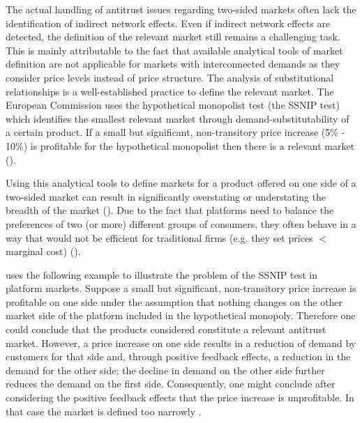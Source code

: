 \documentclass[12pt,a4paper]{scrreprt}
\begin{document}
The actual handling of antitrust issues regarding two-sided markets often lack the identification of indirect network effects. Even if indirect network effects are detected, the definition of the relevant market still remains a challenging task. This is mainly attributable to the fact that available analytical tools of market definition are not applicable for markets with interconnected demands as they consider price levels instead of price structure. The analysis of substitutional relationships is a well-established practice to define the relevant market. The European Commission uses the hypothetical monopolist test (the SSNIP test) which identifies the smallest relevant market through demand-substitutability of a certain product. If a small but significant, non-transitory price increase (5\% - 10\%) is profitable for the hypothetical monopolist then there is a relevant market (\cite{motta_competition_2004}). 

Using this analytical tools to define markets for a product offered on one side of a two-sided market can result in significantly overstating or understating the breadth of the market (\cite{evans_analysis_2008}). Due to the fact that platforms need to balance the preferences of two (or more) different groups of consumers, they often behave in a way that would not be efficient for traditional firms (e.g. they set prices $<$ marginal cost) (\cite{chandra_mergers_2009}).

\cite{evans_market_2012} uses the following example to illustrate the problem of the SSNIP test in platform markets. Suppose a small but significant, non-transitory price increase is profitable on one side under the assumption that nothing changes on the other market side of the platform included in the hypothetical monopoly. Therefore one could conclude that the products considered constitute a relevant antitrust market. However, a price increase on one side results in a reduction of demand by customers for that side and, through positive feedback effects, a reduction in the demand for the other side; the decline in demand on the other side further reduces the demand on the first side. Consequently, one might conclude after considering the positive feedback effects that the price increase is unprofitable. In that case the market is defined too narrowly .
\end{document}
